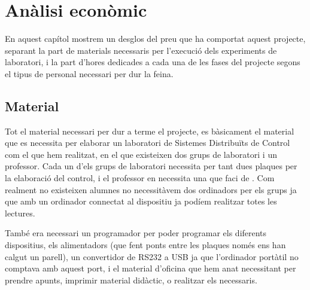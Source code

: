 
\chapter{Anàlisi econòmic}\label{cap:eco} %



\ifpdf
    \graphicspath{{7_economic_analysis/figures/PNG/}{7_economic_analysis/figures/PDF/}{7_economic_analysis/figures/}}
\else
    \graphicspath{{7_economic_analysis/figures/EPS/}{7_economic_analysis/figures/}}
\fi



En aquest capítol mostrem un desglos del preu que ha comportat aquest projecte, separant la part de materials necessaris per l'execució dels experiments de laboratori, i la part d'hores dedicades a cada una de les fases del projecte segons el tipus de personal necessari per dur la feina.

\section{Material}\label{cap:eco:mat}

Tot el material necessari per dur a terme el projecte, es bàsicament el material que es necessita per elaborar un laboratori de Sistemes Distribuïts de Control com el que hem realitzat, en el que existeixen dos grups de laboratori i un professor.
Cada un d'els grups de laboratori necessita per tant dues plaques \FLEX per la elaboració del control, i el professor en necessita una que faci de \Monitor. Com realment no existeixen alumnes no necessitàvem dos ordinadors per els grups ja que amb un ordinador connectat al dispositiu \Monitor ja podíem realitzar totes les lectures.

També era necessari un programador per poder programar els diferents dispositius, els alimentadors (que fent ponts entre les plaques només ens han calgut un parell), un convertidor de RS232 a USB ja que l'ordinador portàtil no comptava amb aquest port, i el material d'oficina que hem anat necessitant per prendre apunts, imprimir material didàctic, o realitzar els \LiveCD necessaris.

